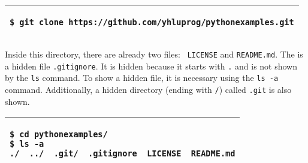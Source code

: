 \noindent
\begin{tabular}{|p{5in}|}\hline
\begin{verbatim}
$ git clone https://github.com/yhluprog/pythonexamples.git
\end{verbatim}
\\ \hline
\end{tabular}
\vspace{0.2in}

The command clones the repository and the following message is shown:

\vspace{0.2in}

\noindent
\begin{tabular}{|p{5in}|}\hline
\begin{verbatim}
Cloning into 'pythonexamples'...
remote: Enumerating objects: 5, done.
remote: Counting objects: 100% (5/5), done.
remote: Compressing objects: 100% (5/5), done.
remote: Total 5 (delta 0), reused 0 (delta 0), pack-reused 0
Unpacking objects: 100% (5/5), done.
Checking connectivity... done.
\end{verbatim}
\\ \hline
\end{tabular}
\vspace{0.2in}

After cloning the repository, a directory (also called folder) with
the name {\tt pythonexamples} is created.  This can be shown
using the {\tt ls} command:

\vspace{0.2in}

\noindent
\begin{tabular}{|p{5in}|}\hline
\begin{verbatim}
$ ls
pythonexamples/
\end{verbatim}
\\ \hline
\end{tabular}
\vspace{0.2in}

Inside this directory, there are already two files: {\tt
  LICENSE} and {\tt README.md}. The is a hidden file {\tt .gitignore}.
It is hidden because it starts with {\tt .} and is not shown by the
{\tt ls} command. To show a hidden file, it is necessary using the
{\tt ls -a} command. Additionally, a hidden directory (ending with
{\tt /}) called {\tt .git} is also shown.

\vspace{0.2in}

\noindent
\begin{tabular}{|p{5in}|}\hline
\begin{verbatim}
$ cd pythonexamples/
$ ls -a
./  ../  .git/	.gitignore  LICENSE  README.md
\end{verbatim}
\\ \hline
\end{tabular}
\vspace{0.2in}

